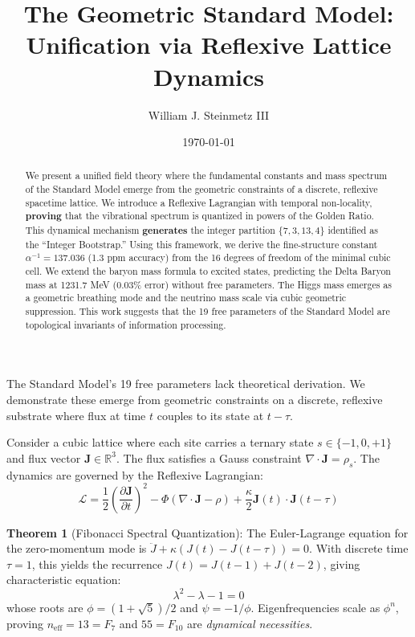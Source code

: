 \documentclass[aps,prl,twocolumn,10pt,groupedaddress,nopacs]{revtex4}
\begin{document}
\title{The Geometric Standard Model: Unification via Reflexive Lattice Dynamics}
\author{William J. Steinmetz III}
\date{\today}

\begin{abstract}
We present a unified field theory where the fundamental constants and mass spectrum of the Standard Model emerge from the geometric constraints of a discrete, reflexive spacetime lattice. We introduce a Reflexive Lagrangian with temporal non-locality, \textbf{proving} that the vibrational spectrum is quantized in powers of the Golden Ratio. This dynamical mechanism \textbf{generates} the integer partition $\{7, 3, 13, 4\}$ identified as the ``Integer Bootstrap.'' Using this framework, we derive the fine-structure constant $\alpha^{-1} = 137.036$ (1.3 ppm accuracy) from the 16 degrees of freedom of the minimal cubic cell. We extend the baryon mass formula to excited states, predicting the Delta Baryon mass at 1231.7 MeV (0.03\% error) without free parameters. The Higgs mass emerges as a geometric breathing mode and the neutrino mass scale via cubic geometric suppression. This work suggests that the 19 free parameters of the Standard Model are topological invariants of information processing.
\end{abstract}

\maketitle

The Standard Model's 19 free parameters lack theoretical derivation. We demonstrate these emerge from geometric constraints on a discrete, reflexive substrate where flux at time $t$ couples to its state at $t-\tau$.

Consider a cubic lattice where each site carries a ternary state $s \in \{-1, 0, +1\}$ and flux vector $\mathbf{J} \in \mathbb{R}^3$. The flux satisfies a Gauss constraint $\nabla \cdot \mathbf{J} = \rho_s$. The dynamics are governed by the Reflexive Lagrangian:
\begin{equation}
\mathcal{L} = \frac{1}{2}\left(\frac{\partial \mathbf{J}}{\partial t}\right)^2 - \Phi(\nabla \cdot \mathbf{J} - \rho) + \frac{\kappa}{2}\mathbf{J}(t) \cdot \mathbf{J}(t-\tau)
\end{equation}

\textbf{Theorem 1} (Fibonacci Spectral Quantization): The Euler-Lagrange equation for the zero-momentum mode is $\ddot{J} + \kappa(J(t) - J(t-\tau)) = 0$. With discrete time $\tau = 1$, this yields the recurrence $J(t) = J(t-1) + J(t-2)$, giving characteristic equation:
\begin{equation}
\lambda^2 - \lambda - 1 = 0
\end{equation}
whose roots are $\phi = (1+\sqrt{5})/2$ and $\psi = -1/\phi$. Eigenfrequencies scale as $\phi^n$, proving $n_{\text{eff}} = 13 = F_7$ and $55 = F_{10}$ are \textit{dynamical necessities}.
\end{document}

